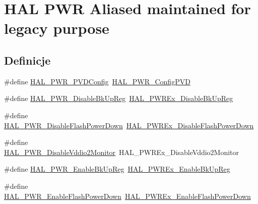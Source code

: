 \hypertarget{group___h_a_l___p_w_r___aliased}{}\section{H\+AL P\+WR Aliased maintained for legacy purpose}
\label{group___h_a_l___p_w_r___aliased}
\subsection*{Definicje}
\begin{DoxyCompactItemize}
\item 
\#define \hyperlink{group___h_a_l___p_w_r___aliased_ga56b037b1ad9b9887c5f073aa10370168}{H\+A\+L\+\_\+\+P\+W\+R\+\_\+\+P\+V\+D\+Config}~\hyperlink{group___p_w_r___exported___functions___group2_ga87e59191de350b0942847624ddbe6d9d}{H\+A\+L\+\_\+\+P\+W\+R\+\_\+\+Config\+P\+VD}
\item 
\#define \hyperlink{group___h_a_l___p_w_r___aliased_ga190c1061330751d78f53b13231044e85}{H\+A\+L\+\_\+\+P\+W\+R\+\_\+\+Disable\+Bk\+Up\+Reg}~\hyperlink{group___p_w_r_ex___exported___functions___group1_gae1b50407389e3ce1132eceb013f823d1}{H\+A\+L\+\_\+\+P\+W\+R\+Ex\+\_\+\+Disable\+Bk\+Up\+Reg}
\item 
\#define \hyperlink{group___h_a_l___p_w_r___aliased_gac95b95ec23381b451ce4634650fb336d}{H\+A\+L\+\_\+\+P\+W\+R\+\_\+\+Disable\+Flash\+Power\+Down}~\hyperlink{group___p_w_r_ex___exported___functions___group1_ga12385932ad48ece7fde94d5c3db5cd19}{H\+A\+L\+\_\+\+P\+W\+R\+Ex\+\_\+\+Disable\+Flash\+Power\+Down}
\item 
\#define \hyperlink{group___h_a_l___p_w_r___aliased_ga33da5f16df6d8fc4c1b5073424302364}{H\+A\+L\+\_\+\+P\+W\+R\+\_\+\+Disable\+Vddio2\+Monitor}~H\+A\+L\+\_\+\+P\+W\+R\+Ex\+\_\+\+Disable\+Vddio2\+Monitor
\item 
\#define \hyperlink{group___h_a_l___p_w_r___aliased_ga3a85d5ac9965f0c58a9a76fd73af4180}{H\+A\+L\+\_\+\+P\+W\+R\+\_\+\+Enable\+Bk\+Up\+Reg}~\hyperlink{group___p_w_r_ex___exported___functions___group1_ga21165778ccc2144040c6a935c9f794a7}{H\+A\+L\+\_\+\+P\+W\+R\+Ex\+\_\+\+Enable\+Bk\+Up\+Reg}
\item 
\#define \hyperlink{group___h_a_l___p_w_r___aliased_ga255d34e05cdc098d1ce2e906f8b9769c}{H\+A\+L\+\_\+\+P\+W\+R\+\_\+\+Enable\+Flash\+Power\+Down}~\hyperlink{group___p_w_r_ex___exported___functions___group1_ga86c72a23f89c3c335ab784f42536b106}{H\+A\+L\+\_\+\+P\+W\+R\+Ex\+\_\+\+Enable\+Flash\+Power\+Down}

\end{DoxyCompactItemize}
